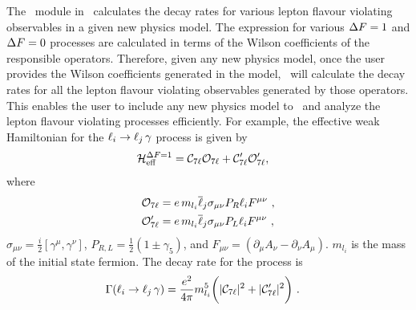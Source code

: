 \documentclass[preprint,3p,12pt]{elsarticle}
\begin{document}
{The \lfv\ module in \hf\ calculates the decay rates for various lepton flavour violating observables in a given new physics model. The expression for various $\Delta F = 1$ and $\Delta F=0$ processes are calculated in terms of the Wilson coefficients of the responsible operators. Therefore, given any new physics model, once the user provides the Wilson coefficients generated in the model, \hf\ will calculate the decay rates for all the lepton flavour violating observables generated by those operators. This enables the user to include any new physics model to \hf\ and analyze the lepton flavour violating processes efficiently. For example, the effective weak Hamiltonian for the $\ell_i \to \ell_j\, \gamma$ process is given by
\begin{align}
\mathcal{H}_{\rm eff}^{\Delta F=1} &=  
\mathcal{C}_{7\ell} \mathcal{O}_{7\ell} + \mathcal{C}_{7\ell}^{\prime} \mathcal{O}_{7\ell}^{\prime} , \nonumber
\end{align}
where
\begin{align}
\mathcal{O}_{7\ell} &= e\, m_{l_i} 
\overline{\ell}_j \sigma_{\mu \nu} P_R \ell_i F^{\mu \nu}\ , \notag \\
\mathcal{O}_{7\ell}^{\prime} &= e\, m_{l_i} 
\overline{\ell}_j \sigma_{\mu \nu} P_L \ell_i F^{\mu \nu}\ , \nonumber
\end{align}
$\sigma_{\mu \nu} = \frac{i}{2}[\gamma^{\mu},\gamma^{\nu}]$, $P_{R,L} = \frac{1}{2} (1\pm\gamma_5)$, and $F_{\mu\nu} = (\partial_{\mu} A_{\nu} - \partial_{\nu} A_{\mu})$. $m_{l_i}$ is the mass of the initial state fermion. The decay rate for the process is
\begin{align}
\Gamma (\ell_i \to \ell_j\, \gamma) &= \frac{e^2}{4\pi} m_{l_i}^5 
\bigg(|\mathcal{C}_{7\ell}|^2 + |\mathcal{C}_{7\ell}^\prime|^2\bigg) \ . \nonumber
\end{align}

}
\end{document}

